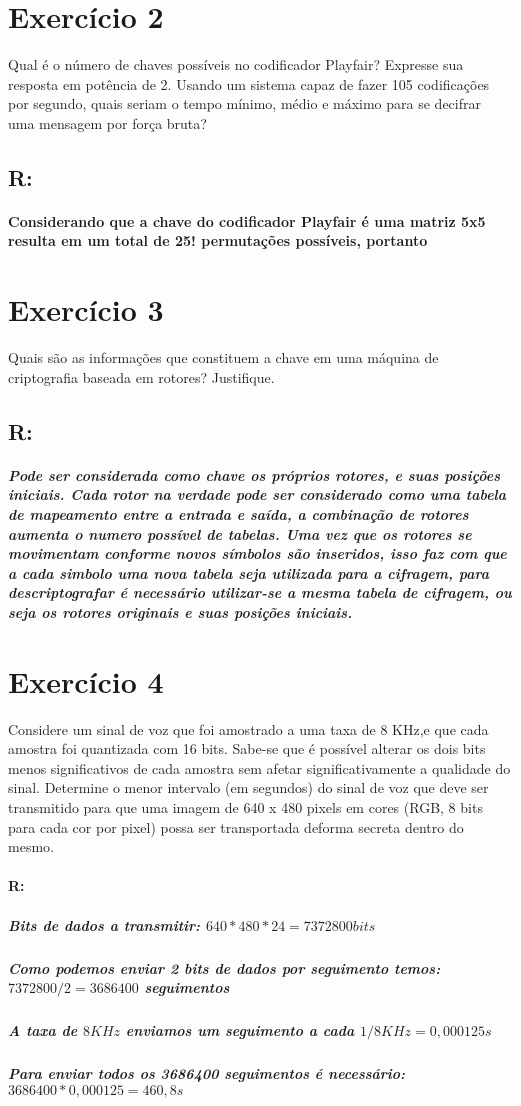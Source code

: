 \documentclass[10pt,a4paper]{article}
\begin{document}
\section*{Exercício 2}
Qual é o número de chaves possíveis no codificador Playfair? Expresse sua resposta em potência de 2. Usando um sistema capaz de fazer 105 codificações por segundo, quais seriam o tempo mínimo, médio e máximo para se decifrar uma mensagem por força bruta?
\subsection*{R:}
\paragraph*{ Considerando que a chave do codificador  Playfair é uma matriz 5x5 resulta em um total de 25! permutações possíveis, portanto }
\section*{Exercício 3}
Quais são as informações que constituem a chave em uma máquina de criptografia baseada em rotores? Justifique.
\subsection*{R:}
\subparagraph*{ Pode ser considerada como chave os próprios rotores, e suas posições iniciais. Cada rotor na verdade pode ser considerado como uma tabela de mapeamento entre a entrada e saída, a combinação de rotores aumenta o numero possível de tabelas. Uma vez que os rotores se movimentam conforme novos símbolos são inseridos, isso faz com que a cada simbolo uma nova tabela seja utilizada para a cifragem, para descriptografar é necessário utilizar-se a mesma tabela de cifragem, ou seja os rotores originais e suas posições iniciais.}
\section*{Exercício 4}
Considere um sinal de voz que foi amostrado a uma taxa de 8 KHz,e que cada amostra foi quantizada com 16 bits. Sabe-se que é possível alterar os dois bits menos significativos de cada amostra sem afetar significativamente a qualidade do sinal. Determine o menor intervalo (em segundos) do sinal de voz que deve ser transmitido para que uma imagem de 640 x 480 pixels em cores (RGB, 8 bits para cada cor por pixel) possa ser transportada deforma secreta dentro do mesmo.
\paragraph*{R:}
\subparagraph*{Bits de dados a transmitir: $640*480*24 = 7372800bits$}
\subparagraph*{Como podemos enviar 2 bits de dados por seguimento temos: $7372800/2 = 3686400$ seguimentos}
\subparagraph*{A taxa de $8KHz$ enviamos um seguimento a cada $1/8KHz = 0,000125s$}
\subparagraph*{Para enviar todos os 3686400 seguimentos é necessário: $3686400*0,000125 = 460,8s $ }
\end{document}
